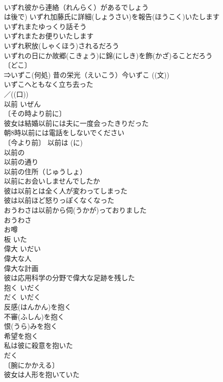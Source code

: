 \documentclass[8pt]{extreport}
\begin{document}
\begin{CJK}{UTF8}{min}
\\	いずれ彼から連絡（れんらく）があるでしょう 
\\	は後で) いずれ加藤氏に詳細(しょうさい)を報告(ほうこく)いたします 
\\	いずれまたゆっくり話そう 
\\	いずれまたお便りいたします 
\\	いずれ釈放(しゃくほう)されるだろう 
\\	いずれの日にか故郷(こきょう)に錦(にしき)を飾(かざ)ることだろう 
\\	〔どこ〕
\\	⇒いずこ(何処) 昔の栄光（えいこう）今いずこ ((文))
\\	いずこへともなく立ち去った 
\\	／((口)) 
\\	以前	いぜん	
\\	〔その時より前に〕
\\	彼女は結婚以前には夫に一度会ったきりだった 
\\	朝8時以前には電話をしないでください 
\\	〔今より前〕 以前は (に) 
\\	以前の 
\\	以前の通り 
\\	以前の住所（じゅうしょ） 
\\	以前にお会いしませんでしたか 
\\	彼は以前とは全く人が変わってしまった 
\\	彼は以前ほど怒りっぽくなくなった 
\\	おうわさは以前から伺(うかが)っておりました 
\\	おうわさ 
\\	お噂
\\	板	いた	
\\	偉大	いだい	
\\	偉大な人 
\\	偉大な計画 
\\	彼は応用科学の分野で偉大な足跡を残した 
\\	抱く	いだく 
\\	だく	いだく 
\\	反感(はんかん)を抱く 
\\	不審(ふしん)を抱く 
\\	恨(うら)みを抱く 
\\	希望を抱く 
\\	私は彼に殺意を抱いた 
\\	だく 
\\	〔腕にかかえる〕
\\	彼女は人形を抱いていた 

\end{CJK}
\end{document}
